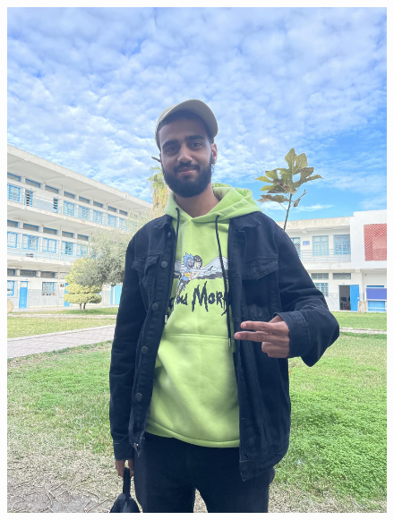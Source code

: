 \begin{figure}[p]
    \centering
    \includegraphics[width=1\textwidth]{chap1.images/binomi.jpg}
\end{figure}

\newpage


